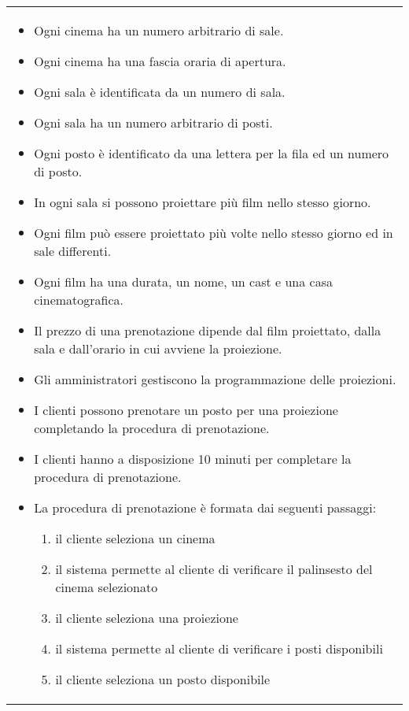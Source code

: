 \begin{longtable}{|p{\linewidth}|}
    \hline
    \begin{itemize}
        \item Ogni cinema ha un numero arbitrario di sale.
        \item Ogni cinema ha una fascia oraria di apertura.
        \item Ogni sala è identificata da un numero di sala.
        \item Ogni sala ha un numero arbitrario di posti.
        \item Ogni posto è identificato da una lettera per la fila ed un numero
              di posto.
        \item In ogni sala si possono proiettare più film nello stesso giorno.
        \item Ogni film può essere proiettato più volte nello stesso giorno ed
              in sale differenti.
        \item Ogni film ha una durata, un nome, un cast e una
              casa cinematografica.
        \item Il prezzo di una prenotazione dipende dal film proiettato,
              dalla sala e dall'orario in cui avviene la proiezione.
        \item Gli amministratori gestiscono la programmazione delle proiezioni.
        \item I clienti possono prenotare un posto per una proiezione
              completando la procedura di prenotazione.
        \item I clienti hanno a disposizione 10 minuti per completare la
              procedura di prenotazione.
        \item La procedura di prenotazione è formata dai seguenti passaggi:
              \begin{enumerate}
                  \item il cliente seleziona un cinema
                  \item il sistema permette al cliente di verificare
                        il palinsesto del cinema selezionato
                  \item il cliente seleziona una proiezione
                  \item il sistema permette al cliente di verificare
                        i posti disponibili
                  \item il cliente seleziona un posto disponibile

\end{enumerate}
\end{itemize}
\end{longtable}
